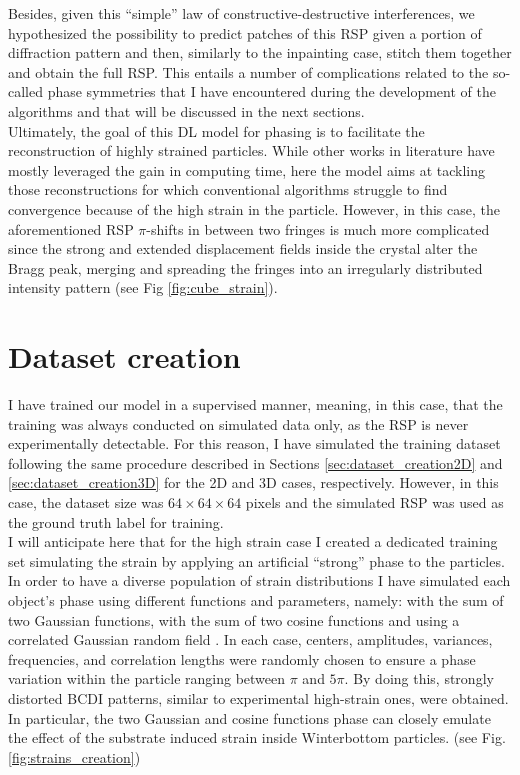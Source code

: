 Besides, given this ``simple'' law of constructive-destructive interferences, we hypothesized the possibility to predict patches 
of this RSP given a portion of diffraction pattern and then, similarly to the inpainting case, stitch them together
and obtain the full RSP. This entails a number of complications related to the so-called phase symmetries that I have encountered
during the development of the algorithms and that will be discussed in the next sections. \\
Ultimately, the goal of this DL model for phasing is to facilitate the reconstruction of highly strained particles. While 
other works in literature have mostly leveraged the gain in computing time, here the model aims at tackling those reconstructions for which 
conventional algorithms struggle to find convergence because of the high strain in the particle.   
However, in this case, the aforementioned RSP $\pi$-shifts in between two fringes is much more complicated since the 
strong and extended displacement fields inside the crystal alter the Bragg peak, merging and spreading the fringes 
into an irregularly distributed intensity pattern (see Fig \ref{fig:cube_strain}).

\section{Dataset creation} 

I have trained our model in a supervised manner, meaning, in this case, that the training was always conducted on simulated data 
only, as the RSP is never experimentally detectable. 
For this reason, I have simulated the training dataset following the same procedure described in Sections 
\ref{sec:dataset_creation2D} and \ref{sec:dataset_creation3D} for the 2D and 3D cases, respectively. However, in this
case, the dataset size was $64\times64\times64$ pixels and the simulated RSP was used as the ground truth label for training.\\

I will anticipate here that for the high strain case I created a dedicated training set simulating the strain by applying 
an artificial ``strong'' phase to the particles. In order to have a diverse population of strain distributions I have 
simulated each object's phase using different functions and parameters, namely: with the sum of two Gaussian functions,
with the sum of two cosine functions and using a correlated Gaussian random field \cite{Gaussian_noise1984}. In each 
case, centers, amplitudes, variances, frequencies, and correlation lengths were randomly chosen to ensure a phase 
variation within the particle ranging between 
$\pi$ and $5\pi$. By doing this, strongly distorted BCDI patterns, similar to experimental high-strain ones, were obtained. 
In particular, the two Gaussian and cosine functions phase can closely emulate the effect of the substrate induced strain inside 
Winterbottom particles. (see Fig.\ref{fig:strains_creation})

